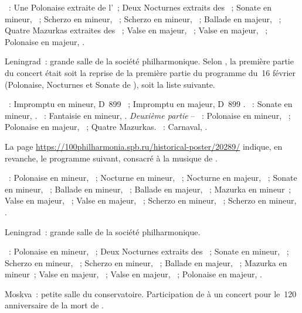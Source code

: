 \begin{description}
 \textsc{\Chopin{}}~: Une Polonaise extraite de l'~; Deux Nocturnes
 extraits des ~; Sonate en \kB \Flat mineur, ~;
 Scherzo en \kB mineur, ~; Scherzo en \kB \Flat mineur, ~;
 Ballade en \kA \Flat majeur, ~; Quatre Mazurkas extraites des
 ~; Valse  en \kD \Flat majeur, 
 ~; Valse  en \kA \Flat majeur,  ~;
 Polonaise en \kA \Flat majeur, .
 \item[\DateWithWeekDay{1947-02-19}]
 Leningrad~: grande salle de la société philharmonique.
 Selon \ASofronitsky{}, la première partie du concert était soit la reprise
 de la première partie du programme du~16 février (Polonaise, Nocturnes et
 Sonate de \Chopin{}), soit la liste suivante.

 \textsc{\Schubert{}}~: Impromptu en \kC mineur, D~899 ~;
 Impromptu en \kA \Flat majeur, D~899 .
 \textsc{\Beethoven{}}~: Sonate en \kC \Sharp mineur,  .
 \textsc{\Chopin{}}~: Fantaisie en \kF mineur, .
 \emph{Deuxième partie} -- \textsc{\Chopin{}}~: Polonaise en \kC \Sharp
 mineur,  ~; Polonaise en \kA majeur, 
 ~; Quatre Mazurkas.
 \textsc{\Schumann{}}~: Carnaval, .

 La page
 \href{https://100philharmonia.spb.ru/historical-poster/20289/}%
 {https://100philharmonia.spb.ru/historical-poster/20289/} indique, en
 revanche, le programme suivant, consacré à la musique de \Chopin{}.

 \textsc{\Chopin{}}~: Polonaise  en \kC mineur, 
 ~; Nocturne en \kC mineur,  ~; Nocturne en \kF
 majeur,  ~; Sonate  en \kB \Flat mineur,
 ~; Ballade  en \kG mineur, ~; Ballade
  en \kA \Flat majeur, ~; Mazurka en \kC \Sharp mineur~;
 Valse en \kA \Flat majeur,  ~; Valse en \kD \Flat
 majeur,  ~; Scherzo  en \kB mineur,
 ~; Scherzo  en \kB \Flat mineur, .
 \item[\DateWithWeekDay{1947-02-23}]
 Leningrad~: grande salle de la société philharmonique.

 \textsc{\Chopin{}}~: Polonaise en \kC mineur,  ~; Deux
 Nocturnes extraits des ~; Sonate en \kB mineur, ~;
 Scherzo en \kB mineur, ~; Scherzo en \kB \Flat mineur, ~;
 Ballade en \kA \Flat majeur, ~; Mazurka en \kC \Sharp mineur~;
 Valse  en \kD \Flat majeur,  ~; Valse
  en \kA \Flat majeur,  ~; Polonaise en \kA
 \Flat majeur, .
 \item[\DateWithWeekDay{1947-03-01}]
 Moskva~: petite salle du conservatoire.
 Participation de \VSofronitsky{} à un concert pour le~120\ieme{}
 anniversaire de la mort de \Beethoven{}.


\end{description}
